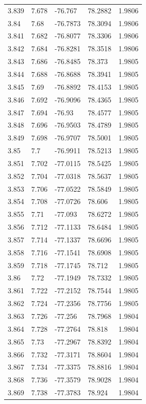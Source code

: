 \begin{tabular}{lllll}
3.839 & 7.678 & -76.767 & 78.2882 & 1.9806 \\
3.84 & 7.68 & -76.7873 & 78.3094 & 1.9806 \\
3.841 & 7.682 & -76.8077 & 78.3306 & 1.9806 \\
3.842 & 7.684 & -76.8281 & 78.3518 & 1.9806 \\
3.843 & 7.686 & -76.8485 & 78.373 & 1.9805 \\
3.844 & 7.688 & -76.8688 & 78.3941 & 1.9805 \\
3.845 & 7.69 & -76.8892 & 78.4153 & 1.9805 \\
3.846 & 7.692 & -76.9096 & 78.4365 & 1.9805 \\
3.847 & 7.694 & -76.93 & 78.4577 & 1.9805 \\
3.848 & 7.696 & -76.9503 & 78.4789 & 1.9805 \\
3.849 & 7.698 & -76.9707 & 78.5001 & 1.9805 \\
3.85 & 7.7 & -76.9911 & 78.5213 & 1.9805 \\
3.851 & 7.702 & -77.0115 & 78.5425 & 1.9805 \\
3.852 & 7.704 & -77.0318 & 78.5637 & 1.9805 \\
3.853 & 7.706 & -77.0522 & 78.5849 & 1.9805 \\
3.854 & 7.708 & -77.0726 & 78.606 & 1.9805 \\
3.855 & 7.71 & -77.093 & 78.6272 & 1.9805 \\
3.856 & 7.712 & -77.1133 & 78.6484 & 1.9805 \\
3.857 & 7.714 & -77.1337 & 78.6696 & 1.9805 \\
3.858 & 7.716 & -77.1541 & 78.6908 & 1.9805 \\
3.859 & 7.718 & -77.1745 & 78.712 & 1.9805 \\
3.86 & 7.72 & -77.1949 & 78.7332 & 1.9805 \\
3.861 & 7.722 & -77.2152 & 78.7544 & 1.9805 \\
3.862 & 7.724 & -77.2356 & 78.7756 & 1.9805 \\
3.863 & 7.726 & -77.256 & 78.7968 & 1.9804 \\
3.864 & 7.728 & -77.2764 & 78.818 & 1.9804 \\
3.865 & 7.73 & -77.2967 & 78.8392 & 1.9804 \\
3.866 & 7.732 & -77.3171 & 78.8604 & 1.9804 \\
3.867 & 7.734 & -77.3375 & 78.8816 & 1.9804 \\
3.868 & 7.736 & -77.3579 & 78.9028 & 1.9804 \\
3.869 & 7.738 & -77.3783 & 78.924 & 1.9804 \\

\end{tabular}
